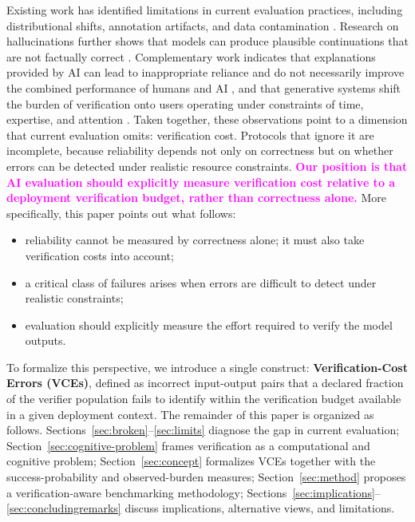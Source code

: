 \documentclass[11pt]{article}
\newcommand{\rev}[1]{\textcolor{magenta}{#1}}
\newcommand{\cfix}[1]{\textcolor{green!50!black}{#1}}
\newcommand{\tidy}[1]{\textcolor{blue!60!black}{#1}}
\newcommand{\viola}[1]{\textcolor[HTML]{7030A0}{#1}}
\newcommand{\rev}[1]{#1}
\newcommand{\cfix}[1]{#1}
\newcommand{\tidy}[1]{#1}
\newcommand{\viola}[1]{#1}
\begin{document}
Existing work has identified limitations in current evaluation practices, including distributional shifts, annotation artifacts, and data contamination \citep{liang2023helm, kiela2021dynabench, deng2024contamination}. \cfix{Research on hallucinations further shows that models can produce plausible continuations that are not factually correct \citep{lin2022truthfulqa, li2023halueval}.} \cfix{\viola{Complementary work indicates} that explanations provided by AI can lead to inappropriate reliance and do not necessarily improve the combined performance of humans and AI \citep{bansal2021does},} and that generative systems shift the burden of verification onto users operating under constraints of time, expertise, and attention \citep{sariyar2026gecos, Immediato2025-POM}.
\tidy{Taken together, these observations point to a dimension that current evaluation omits: verification cost. Protocols that ignore it are incomplete, because reliability depends not only on correctness but on whether errors can be detected under realistic resource constraints.}
\rev{\textbf{Our position is that AI evaluation should explicitly measure verification cost relative to a deployment verification budget, rather than correctness alone.}}
More specifically, this paper points out what follows:
\begin{itemize}
    \item reliability cannot be measured by correctness alone; it must also take verification costs into account;

    \item a critical class of failures arises when errors are difficult to detect under realistic constraints;

    \item evaluation should explicitly measure the effort required to verify the model outputs.

\end{itemize}
To formalize this perspective, we introduce \viola{a single construct}:
\textbf{Verification-Cost Errors (VCEs)}, \viola{defined as incorrect input-output pairs that a declared fraction of the verifier population fails to identify within the verification budget available in a given deployment context}.
The remainder of this paper is organized as follows. Sections~\ref{sec:broken}--\ref{sec:limits} diagnose the gap in current evaluation; Section~\ref{sec:cognitive-problem} frames verification as a computational and cognitive problem; Section~\ref{sec:concept} \viola{formalizes VCEs together with the success-probability and observed-burden measures}; Section~\ref{sec:method} proposes a verification-aware benchmarking methodology; Sections~\ref{sec:implications}--\ref{sec:concludingremarks} discuss implications, alternative views, and limitations.
\end{document}

